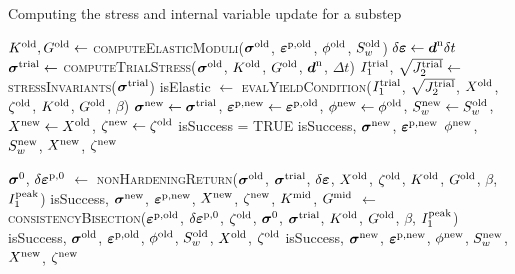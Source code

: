 \begin{breakablealgorithm}
  \caption{Computing the stress and internal variable update for a substep}
  \begin{algorithmic}[1]
      \State $K^{\text{old}}, G^{\text{old}} \leftarrow$ \textsc{computeElasticModuli}($\boldsymbol{\sigma}^{\text{old}}$, $\boldsymbol{\varepsilon}^{\text{p},\text{old}}$,
                                                                 $\phi^{\text{old}}$, $S_w^{\text{old}}$)
      \State $\delta \boldsymbol{\varepsilon} \leftarrow \boldsymbol{d}^{\text{n}} \delta t$
      \State $\boldsymbol{\sigma}^{\text{trial}} \leftarrow$ \textsc{computeTrialStress}($\boldsymbol{\sigma}^{\text{old}}$, $K^{\text{old}}$, $G^{\text{old}}$,
                                                                  $\boldsymbol{d}^{\text{n}}$, $\Delta t$)
      \State $I_1^{\text{trial}}$, $\sqrt{J_2^{\text{trial}}} \leftarrow$ \textsc{stressInvariants}($\boldsymbol{\sigma}^{\text{trial}}$)
      \State isElastic $\leftarrow$ \textsc{evalYieldCondition}($I_1^{\text{trial}}$, $\sqrt{J_2^{\text{trial}}}$, $X^{\text{old}}$, 
                                                                $\zeta^{\text{old}}$, $K^{\text{old}}$, $G^{\text{old}}$, $\beta$)
        \State $\boldsymbol{\sigma}^{\text{new}} \leftarrow \boldsymbol{\sigma}^{\text{trial}}$,
               $\boldsymbol{\varepsilon}^{\text{p},\text{new}} \leftarrow \boldsymbol{\varepsilon}^{\text{p},\text{old}}$,
               $\phi^{\text{new}} \leftarrow \phi^{\text{old}}$,
               $S_w^{\text{new}} \leftarrow S_w^{\text{old}}$,
               $X^{\text{new}} \leftarrow X^{\text{old}}$,
               $\zeta^{\text{new}} \leftarrow \zeta^{\text{old}}$
        \State isSuccess = TRUE
        \State \Return isSuccess, $\boldsymbol{\sigma}^{\text{new}}$, $\boldsymbol{\varepsilon}^{\text{p},\text{new}}$ $\phi^{\text{new}}$, $S_w^{\text{new}}$, $X^{\text{new}}$,
               $\zeta^{\text{new}}$
      \EndIf

      \State $\boldsymbol{\sigma}^0$, $\delta\boldsymbol{\varepsilon}^{\text{p},0}$ $\leftarrow$
        \textsc{nonHardeningReturn}($\boldsymbol{\sigma}^{\text{old}}$, $\boldsymbol{\sigma}^{\text{trial}}$, $\delta\boldsymbol{\varepsilon}$,
                                     $X^{\text{old}}$, $\zeta^{\text{old}}$, $K^{\text{old}}$, $G^{\text{old}}$, $\beta$, $I_1^{\text{peak}}$)
      \State isSuccess, $\boldsymbol{\sigma}^{\text{new}}$, $\boldsymbol{\varepsilon}^{\text{p},\text{new}}$, $X^{\text{new}}$, $\zeta^{\text{new}}$, $K^{\text{mid}}$, $G^{\text{mid}}$
        $\leftarrow$ \textsc{consistencyBisection}($\boldsymbol{\varepsilon}^{\text{p},\text{old}}$, $\delta\boldsymbol{\varepsilon}^{\text{p},0}$, $\zeta^{\text{old}}$,
                                     $\boldsymbol{\sigma}^0$, $\boldsymbol{\sigma}^{\text{trial}}$, $K^{\text{old}}$, $G^{\text{old}}$, $\beta$, $I_1^{\text{peak}}$)
        \State \Return isSuccess, $\boldsymbol{\sigma}^{\text{old}}$, $\boldsymbol{\varepsilon}^{\text{p},\text{old}}$, $\phi^{\text{old}}$, $S_w^{\text{old}}$, $X^{\text{old}}$, 
          $\zeta^{\text{old}}$
      \EndIf
      \State \Return isSuccess, $\boldsymbol{\sigma}^{\text{new}}$, $\boldsymbol{\varepsilon}^{\text{p},\text{new}}$, $\phi^{\text{new}}$, $S_w^{\text{new}}$, $X^{\text{new}}$, 
          $\zeta^{\text{new}}$
    \EndProcedure
  \end{algorithmic}
\end{breakablealgorithm}

